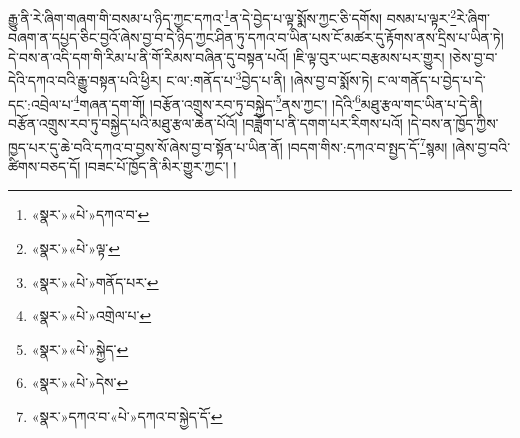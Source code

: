 རྒྱུ་ནི་རེ་ཞིག་གཞག་གི་བསམ་པ་ཉིད་ཀྱང་དཀའ་\footnote{«སྣར་»«པེ་»དཀའ་བ་}ན་དེ་བྱེད་པ་ལྟ་སྨོས་ཀྱང་ཅི་དགོས། བསམ་པ་ལྟར་\footnote{«སྣར་»«པེ་»ལྟ་}རེ་ཞིག་བཞག་ན་དཔྱད་ཅིང་བྱའོ་ཞེས་བྱ་བ་དེ་ཉིད་ཀྱང་ཤིན་ཏུ་དཀའ་བ་ཡིན་པས་ངོ་མཚར་དུ་རྟོགས་ནས་དྲིས་པ་ཡིན་ཏེ། དེ་བས་ན་འདི་དག་གི་རིམ་པ་ནི་གོ་རིམས་བཞིན་དུ་བསྟན་པའོ། །ཇི་ལྟ་བུར་ཡང་བརྩམས་པར་གྱུར། །ཅེས་བྱ་བ་དེའི་དཀའ་བའི་རྒྱུ་བསྟན་པའི་ཕྱིར། ང་ལ་:གནོད་པ་\footnote{«སྣར་»«པེ་»གནོད་པར་}བྱེད་པ་ནི། །ཞེས་བྱ་བ་སྨོས་ཏེ། ང་ལ་གནོད་པ་བྱེད་པ་དེ་དང་:འབྲེལ་པ་\footnote{«སྣར་»«པེ་»འགྲེལ་པ་}གཞན་དག་གོ། །བརྩོན་འགྲུས་རབ་ཏུ་བསྐྱེད་\footnote{«སྣར་»«པེ་»སྐྱེད་}ནས་ཀྱང་། །དེའི་\footnote{«སྣར་»«པེ་»དེས་}མཐུ་རྩལ་གང་ཡིན་པ་དེ་ནི། བརྩོན་འགྲུས་རབ་ཏུ་བསྐྱེད་པའི་མཐུ་རྩལ་ཆེན་པོའོ། །བཟློག་པ་ནི་དགག་པར་རིགས་པའོ། །དེ་བས་ན་ཁྱོད་ཀྱིས་ཁྱད་པར་དུ་ཆེ་བའི་དཀའ་བ་བྱས་སོ་ཞེས་བྱ་བ་སྟོན་པ་ཡིན་ནོ། །བདག་གིས་:དཀའ་བ་སྤྱད་དོ་\footnote{«སྣར་»དཀའ་བ་«པེ་»དཀའ་བ་སྐྱེད་དོ་}སྙམ། །ཞེས་བྱ་བའི་ཚིགས་བཅད་དོ། །བཟང་པོ་ཁྱོད་ནི་མིར་གྱུར་ཀྱང་། །
